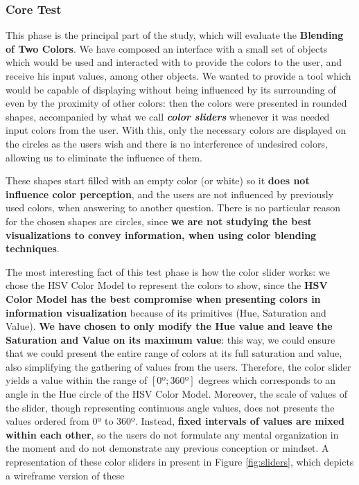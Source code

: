 \subsubsection{Core Test}
%
This phase is the principal part of the study, which will evaluate the \textbf{Blending of Two Colors}. We have
composed an interface with a small set of objects which would be used and interacted with to provide the colors
to the user, and receive his input values, among other objects. We wanted to provide a tool which would be
capable of displaying without being influenced by its surrounding of even by the proximity of other colors: then
the colors were presented in rounded shapes, accompanied by what we call \emph{\textbf{color sliders}} whenever
it was needed input colors from the user. With this, only the necessary colors are displayed on the circles as
the users wish and there is no interference of undesired colors, allowing us to eliminate the influence of them. \par
%
These shapes start filled with an empty color (or white) so it \textbf{does not influence color perception},
and the users are not influenced by previously used colors, when answering to another question. There is no
particular reason for the chosen shapes are circles, since \textbf{we are not studying the best visualizations
to convey information, when using color blending techniques}. \par
%
The most interesting fact of this test phase is how the color slider works: we chose the HSV Color Model to
represent the colors to show, since the \textbf{HSV Color Model has the best compromise when presenting colors
in information visualization} because of its primitives (Hue, Saturation and Value). \textbf{We have chosen to
only modify the Hue value and leave the Saturation and Value on its maximum value}: this way, we could ensure
that we could present the entire range of colors at its full saturation and value, also simplifying the gathering
of values from the users. Therefore, the color slider yields a value within the range of $[0º ; 360º]$ degrees
which corresponds to an angle in the Hue circle of the HSV Color Model. Moreover, the scale of values of the
slider, though representing continuous angle values, does not presents the values ordered from 0º to 360º.
Instead, \textbf{fixed intervals of values are mixed within each other}, so the users do not formulate any
mental organization in the moment and do not demonstrate any previous conception or mindset. A representation
of these color sliders in present in Figure \ref{fig:sliders}, which depicts a wireframe version of these
